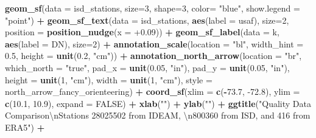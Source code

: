 \documentclass[12pt,twoside]{reedthesis}
\newenvironment{Shaded}{\begin{snugshade}}{\end{snugshade}}
\newcommand{\CharTok}[1]{\textcolor[rgb]{0.31,0.60,0.02}{#1}}
\newcommand{\DataTypeTok}[1]{\textcolor[rgb]{0.13,0.29,0.53}{#1}}
\newcommand{\DecValTok}[1]{\textcolor[rgb]{0.00,0.00,0.81}{#1}}
\newcommand{\FloatTok}[1]{\textcolor[rgb]{0.00,0.00,0.81}{#1}}
\newcommand{\KeywordTok}[1]{\textcolor[rgb]{0.13,0.29,0.53}{\textbf{#1}}}
\newcommand{\NormalTok}[1]{#1}
\newcommand{\OperatorTok}[1]{\textcolor[rgb]{0.81,0.36,0.00}{\textbf{#1}}}
\newcommand{\OtherTok}[1]{\textcolor[rgb]{0.56,0.35,0.01}{#1}}
\newcommand{\StringTok}[1]{\textcolor[rgb]{0.31,0.60,0.02}{#1}}
\begin{document}
\begin{Shaded}
\begin{Highlighting}[]
{{{{\StringTok{  }\KeywordTok{geom_sf}\NormalTok{(}\DataTypeTok{data =}\NormalTok{ isd_stations, }\DataTypeTok{size=}\DecValTok{3}\NormalTok{, }\DataTypeTok{shape=}\DecValTok{3}\NormalTok{, }\DataTypeTok{color=} \StringTok{"blue"}\NormalTok{, }\DataTypeTok{show.legend =} \StringTok{"point"}\NormalTok{) }\OperatorTok{+}
\StringTok{  }\KeywordTok{geom_sf_text}\NormalTok{(}\DataTypeTok{data =}\NormalTok{ isd_stations, }\KeywordTok{aes}\NormalTok{(}\DataTypeTok{label =}\NormalTok{ usaf), }\DataTypeTok{size=}\DecValTok{2}\NormalTok{, }\DataTypeTok{position =} \KeywordTok{position_nudge}\NormalTok{(}\DataTypeTok{x =} \FloatTok{+0.09}\NormalTok{)) }\OperatorTok{+}
\StringTok{  }\KeywordTok{geom_sf_label}\NormalTok{(}\DataTypeTok{data =}\NormalTok{ k, }\KeywordTok{aes}\NormalTok{(}\DataTypeTok{label =}\NormalTok{ DN), }\DataTypeTok{size=}\DecValTok{2}\NormalTok{) }\OperatorTok{+}
\StringTok{  }\KeywordTok{annotation_scale}\NormalTok{(}\DataTypeTok{location =} \StringTok{"bl"}\NormalTok{, }\DataTypeTok{width_hint =} \FloatTok{0.5}\NormalTok{, }\DataTypeTok{height =} \KeywordTok{unit}\NormalTok{(}\FloatTok{0.2}\NormalTok{, }\StringTok{"cm"}\NormalTok{)) }\OperatorTok{+}
\StringTok{  }\KeywordTok{annotation_north_arrow}\NormalTok{(}\DataTypeTok{location =} \StringTok{"br"}\NormalTok{, }\DataTypeTok{which_north =} \StringTok{"true"}\NormalTok{, }\DataTypeTok{pad_x =} \KeywordTok{unit}\NormalTok{(}\FloatTok{0.05}\NormalTok{, }\StringTok{"in"}\NormalTok{), }\DataTypeTok{pad_y =} \KeywordTok{unit}\NormalTok{(}\FloatTok{0.05}\NormalTok{, }\StringTok{"in"}\NormalTok{), }\DataTypeTok{height =} \KeywordTok{unit}\NormalTok{(}\DecValTok{1}\NormalTok{, }\StringTok{"cm"}\NormalTok{), }
   \DataTypeTok{width =} \KeywordTok{unit}\NormalTok{(}\DecValTok{1}\NormalTok{, }\StringTok{"cm"}\NormalTok{), }\DataTypeTok{style =}\NormalTok{ north_arrow_fancy_orienteering) }\OperatorTok{+}
\StringTok{  }\KeywordTok{coord_sf}\NormalTok{(}\DataTypeTok{xlim =} \KeywordTok{c}\NormalTok{(}\OperatorTok{-}\FloatTok{73.7}\NormalTok{, }\FloatTok{-72.8}\NormalTok{), }\DataTypeTok{ylim =} \KeywordTok{c}\NormalTok{(}\FloatTok{10.1}\NormalTok{, }\FloatTok{10.9}\NormalTok{), }\DataTypeTok{expand =} \OtherTok{FALSE}\NormalTok{) }\OperatorTok{+}
\StringTok{  }\KeywordTok{xlab}\NormalTok{(}\StringTok{""}\NormalTok{) }\OperatorTok{+}\StringTok{ }
\StringTok{  }\KeywordTok{ylab}\NormalTok{(}\StringTok{""}\NormalTok{) }\OperatorTok{+}\StringTok{ }
\StringTok{  }\KeywordTok{ggtitle}\NormalTok{(}\StringTok{"Quality Data Comparison}\CharTok{\textbackslash{}n}\StringTok{Stations 28025502 from IDEAM, }\CharTok{\textbackslash{}n}\StringTok{800360 from ISD, and 416 from ERA5"}\NormalTok{) }\OperatorTok{+}
}}}}
\end{Highlighting}
\end{Shaded}
\end{document}
